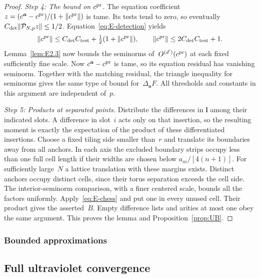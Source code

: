 \begin{proof}
\emph{Step 4: The bound on $c^{\rm pr}$.} The equation coefficient $z=(c^{\boldsymbol a}-c^{\rm pr})/(1+\|c^{\rm pr}\|)$ is tame. Its tests tend to zero, so eventually $C_{\rm det}\|\mathcal P_{N,p}z\|\le1/2$. Equation~\eqref{eq:E-detection} yields
\begin{equation*}
\|c^{\rm pr}\|\le C_{\rm det}C_{\rm test}+\tfrac12(1+\|c^{\rm pr}\|),\qquad
\|c^{\rm pr}\|\le2C_{\rm det}C_{\rm test}+1.
\end{equation*}
Lemma~\ref{lem:E2.3} now bounds the seminorms of~$O^{(d')}(c^{\rm pr})$ at each fixed sufficiently fine scale. Now $c^{\boldsymbol a}-c^{\rm pr}$ is tame, so its equation residual has vanishing seminorm. Together with the matching residual, the triangle inequality for seminorms gives the same type of bound for~$\Delta_{\boldsymbol a}F$. All thresholds and constants in this argument are independent of~$p$.

\emph{Step 5: Products at separated points.} Distribute the differences in $\boldsymbol l$ among their indicated slots. A difference in slot~$i$ acts only on that insertion, so the resulting moment is exactly the expectation of the product of these differentiated insertions. Choose a fixed tiling side smaller than~$r$ and translate its boundaries away from all anchors. In each axis the excluded boundary strips occupy less than one full cell length if their widths are chosen below $a_m/[4(n+1)]$. For sufficiently large~$N$ a lattice translation with these margins exists. Distinct anchors occupy distinct cells, since their torus separation exceeds the cell side. The interior-seminorm comparison, with a finer centered scale, bounds all the factors uniformly. Apply~\eqref{eq:E-chess} and put one in every unused cell. Their product gives the asserted~$B$. Empty difference lists and arities at most one obey the same argument. This proves the lemma and Proposition~\ref{prop:UB}.
\end{proof}

\subsubsection{Bounded approximations}\label{sec:partII-E.2.7}



\subsection{Full ultraviolet convergence}\label{sec:partII-E.3}

